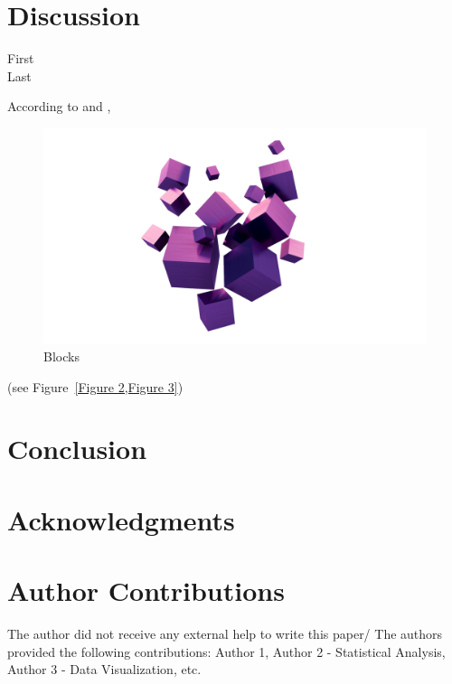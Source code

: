 \documentclass[	DIV=calc,%
							paper=a4,%
							fontsize=12pt,%
							twocolumn]{scrartcl}	 					%
\begin{document}
\begin{itemize}
\section*{Discussion}
\; \; %
\lipsum[7]

\begin{description}
	\item[First] \lipsum[30] 
	\item[Last] \lipsum[30] 
\end{description}

\lipsum[3] 
According to \citet{Ref1} and \citet{Ref2}, %
\lipsum[2] 

\begin{figure}[H] %
    \centering
    \includegraphics[width=\columnwidth]{13.png}
    \caption{Blocks}
    \label{Figure 2}
\end{figure}

\lipsum[5](see Figure~\ref{Figure 2,Figure 3})

\section*{Conclusion}
\; \; %
\lipsum[8]

\lipsum[8]

\lipsum[8]

\section*{Acknowledgments}
\; \; %
\lipsum[1]

\section*{Author Contributions}
\; \; %
The author did not receive any external help to write this paper/ The authors provided the following contributions: Author 1, Author 2 - Statistical Analysis, Author 3 - Data Visualization, etc.


\end{itemize}
\end{document}
